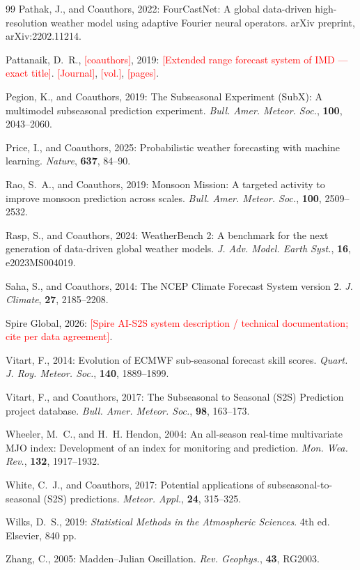 \documentclass[11pt]{article}
\newcommand{\ph}[1]{\textcolor{red}{[#1]}}
\begin{document}
\begin{thebibliography}{99}
Pathak, J., and Coauthors, 2022: FourCastNet: A global data-driven
high-resolution weather model using adaptive Fourier neural
operators. arXiv preprint, arXiv:2202.11214.

Pattanaik, D.~R., \ph{coauthors}, 2019: \ph{Extended range forecast
system of IMD --- exact title}. \ph{Journal}, \ph{vol.},
\ph{pages}. %

Pegion, K., and Coauthors, 2019: The Subseasonal Experiment (SubX):
A multimodel subseasonal prediction experiment. \textit{Bull. Amer.
Meteor. Soc.}, \textbf{100}, 2043--2060.

Price, I., and Coauthors, 2025: Probabilistic weather forecasting
with machine learning. \textit{Nature}, \textbf{637}, 84--90. %

Rao, S.~A., and Coauthors, 2019: Monsoon Mission: A targeted activity
to improve monsoon prediction across scales. \textit{Bull. Amer.
Meteor. Soc.}, \textbf{100}, 2509--2532. %

Rasp, S., and Coauthors, 2024: WeatherBench 2: A benchmark for the
next generation of data-driven global weather models. \textit{J. Adv.
Model. Earth Syst.}, \textbf{16}, e2023MS004019.

Saha, S., and Coauthors, 2014: The NCEP Climate Forecast System
version 2. \textit{J. Climate}, \textbf{27}, 2185--2208.

Spire Global, 2026: \ph{Spire AI-S2S system description / technical
documentation; cite per data agreement}. %

Vitart, F., 2014: Evolution of ECMWF sub-seasonal forecast skill
scores. \textit{Quart. J. Roy. Meteor. Soc.}, \textbf{140},
1889--1899.

Vitart, F., and Coauthors, 2017: The Subseasonal to Seasonal (S2S)
Prediction project database. \textit{Bull. Amer. Meteor. Soc.},
\textbf{98}, 163--173.

Wheeler, M.~C., and H.~H. Hendon, 2004: An all-season real-time
multivariate MJO index: Development of an index for monitoring and
prediction. \textit{Mon. Wea. Rev.}, \textbf{132}, 1917--1932.

White, C.~J., and Coauthors, 2017: Potential applications of
subseasonal-to-seasonal (S2S) predictions. \textit{Meteor. Appl.},
\textbf{24}, 315--325.

Wilks, D.~S., 2019: \textit{Statistical Methods in the Atmospheric
Sciences}. 4th ed. Elsevier, 840 pp. %

Zhang, C., 2005: Madden--Julian Oscillation. \textit{Rev. Geophys.},
\textbf{43}, RG2003.

\end{thebibliography}
\end{document}
